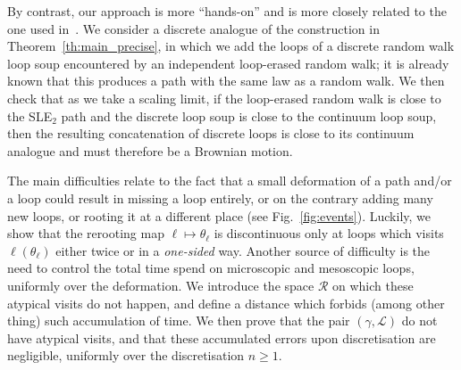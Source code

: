 \documentclass[11pt]{article}
\def\cL{{\mathcal L}}
\def\Conf{{\mathscr{R}}}
\begin{document}
By contrast, our approach is more ``hands-on'' and is more closely related to the one used in~\cite{SapozhnikovShiraishi}. We consider a discrete analogue of the construction in Theorem~\ref{th:main_precise}, in which we add the loops of a discrete random walk loop soup encountered by an independent loop-erased random walk; it is already known that this produces a path with the same law as a random walk. We then check that as we take a scaling limit, if the loop-erased random walk is close to the SLE$_2$ path and the discrete loop soup is close to the continuum loop soup, then the resulting concatenation of discrete loops is close to its continuum analogue and must therefore be a Brownian motion.

The main difficulties relate to the fact that a small deformation of a path and/or a loop could result in missing a loop entirely, or on the contrary adding many new loops, or rooting it at a different place (see Fig.~\ref{fig:events}).
Luckily, we show that the rerooting map $\ell \mapsto \theta_\ell$ is discontinuous only at loops which visits $\ell(\theta_\ell)$ either twice or in a \textit{one-sided} way.  Another source of difficulty is the need to control the total time spend on microscopic and mesoscopic loops, uniformly over the deformation. We introduce the space $\Conf$ on which these atypical visits do not happen, and define a distance which forbids (among other thing) such accumulation of time. We then prove that the pair $(\gamma, \cL)$ do not have atypical visits, and that these accumulated errors upon discretisation are negligible, uniformly over the discretisation $n\ge 1$.








\end{document}
